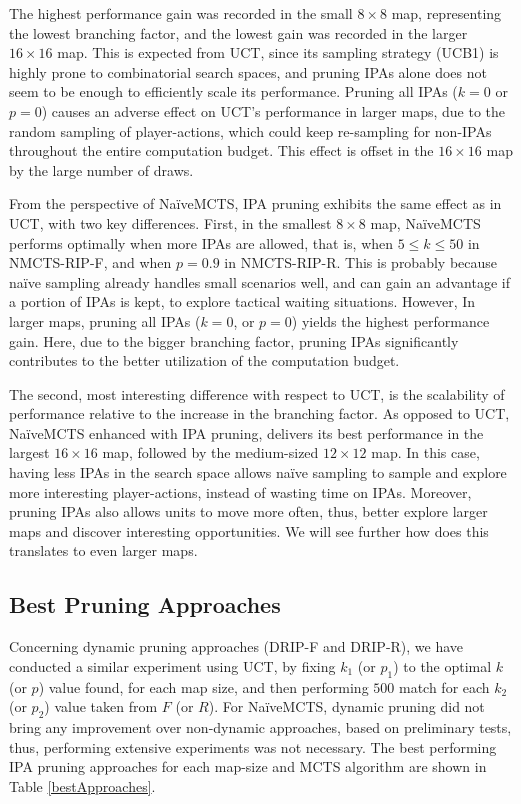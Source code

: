 \documentclass[conference]{IEEEtran}
\begin{document}
The highest performance gain was recorded in the small $8\times8$ map, representing the lowest branching factor, and the lowest gain was recorded in the larger $16\times16$ map. This is expected from UCT, since its sampling strategy (UCB1) is highly prone to combinatorial search spaces, and pruning IPAs alone does not seem to be enough to efficiently scale its performance. Pruning all IPAs ($k = 0$ or $p = 0$) causes an adverse effect on UCT's performance in larger maps, due to the random sampling of player-actions, which could keep re-sampling for non-IPAs throughout the entire computation budget. This effect is offset in the $16\times16$ map by the large number of draws.

From the perspective of NaïveMCTS, IPA pruning exhibits the same effect as in UCT, with two key differences. First, in the smallest $8\times8$ map, NaïveMCTS performs optimally when more IPAs are allowed, that is, when $5 \leq k \leq 50$ in NMCTS-RIP-F, and when $p=0.9$ in NMCTS-RIP-R. This is probably because naïve sampling already handles small scenarios well, and can gain an advantage if a portion of IPAs is kept, to explore tactical waiting situations. However, In larger maps, pruning all IPAs ($k = 0$, or $p = 0$) yields the highest performance gain. Here, due to the bigger branching factor, pruning IPAs significantly contributes to the better utilization of the computation budget.

The second, most interesting difference with respect to UCT, is the scalability of performance relative to the increase in the branching factor. As opposed to UCT, NaïveMCTS enhanced with IPA pruning, delivers its best performance in the largest $16\times16$ map, followed by the medium-sized $12\times12$ map. In this case, having less IPAs in the search space allows naïve sampling to sample and explore more interesting player-actions, instead of wasting time on IPAs. Moreover, pruning IPAs also allows units to move more often, thus, better explore larger maps and discover interesting opportunities. We will see further how does this translates to even larger maps.


\subsection{Best Pruning Approaches}

Concerning dynamic pruning approaches (DRIP-F and DRIP-R), we have conducted a similar experiment using UCT, by fixing $k_1$ (or $p_1$) to the optimal $k$ (or $p$) value found, for each map size, and then performing $500$ match for each $k_2$ (or $p_2$) value taken from $F$ (or $R$). For NaïveMCTS, dynamic pruning did not bring any improvement over non-dynamic approaches, based on preliminary tests, thus, performing extensive experiments was not necessary. The best performing IPA pruning approaches for each map-size and MCTS algorithm are shown in Table \ref{bestApproaches}.
\end{document}
